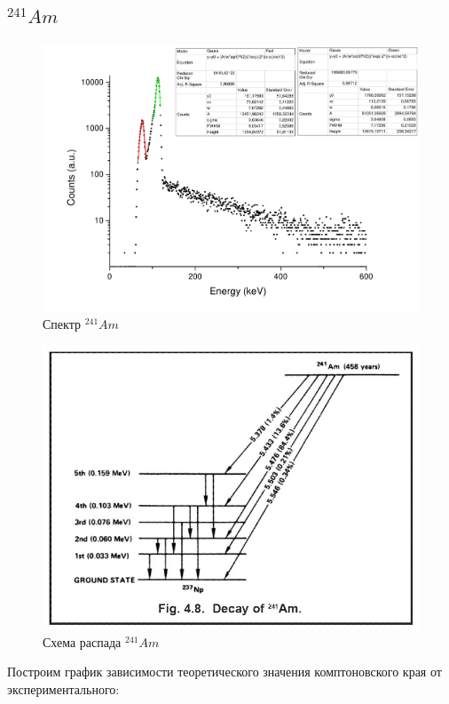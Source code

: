 \documentclass[a4paper,12pt]{article}
\begin{document}
	        
	    \pagebreak
	        
	   \subsection{$^{241}Am$}
	  
	    \begin{figure}[h!]
	            \centering
	            \includegraphics[width=\linewidth]{am241.pdf}
	            \caption{Спектр $^{241}Am$}
	            \label{cs137_e}
	        \end{figure}
	        
	        \begin{figure}[h!]
	            \centering
	            \includegraphics[width=0.4\linewidth]{Am-241_decay.jpg}
	            \caption{Схема распада $^{241}Am$}
	            \label{cs137_d}
	        \end{figure}
	        
	        \newpage
	        
	  Построим график зависимости теоретического значения комптоновского края от экспериментального:
	  
\end{document}
